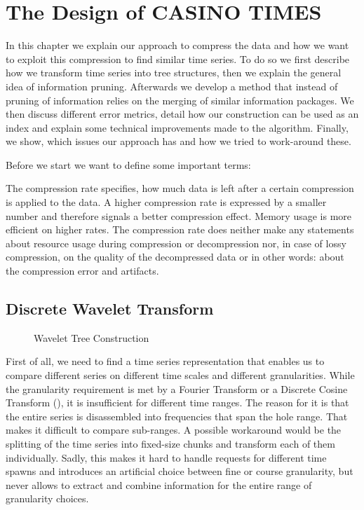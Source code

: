 \chapter{The Design of CASINO TIMES}
\label{ch:algorithm}

In this chapter we explain our approach to compress the data and how we want to exploit this compression to find similar time series. To do so we first describe how we transform time series into tree structures, then we explain the general idea of information pruning. Afterwards we develop a method that instead of pruning of information relies on the merging of similar information packages. We then discuss different error metrics, detail how our construction can be used as an index and explain some technical improvements made to the algorithm. Finally, we show, which issues our approach has and how we tried to work-around these.

Before we start we want to define some important terms:

\begin{definition}
    The compression rate specifies, how much data is left after a certain compression is applied to the data. A higher compression rate is expressed by a smaller number and therefore signals a better compression effect. Memory usage is more efficient on higher rates. The compression rate does neither make any statements about resource usage during compression or decompression nor, in case of lossy compression, on the quality of the decompressed data or in other words: about the compression error and artifacts.
\end{definition}



\section{Discrete Wavelet Transform}
\label{sec:algorithm:wavelet}

\begin{figure}
    \centering
    
    \caption{Wavelet Tree Construction}\label{fig:wavelet_tree_example}
\end{figure}

First of all, we need to find a time series representation that enables us to compare different series on different time scales and different granularities. While the granularity requirement is met by a Fourier Transform or a Discrete Cosine Transform (\cite{DCT1,DCT2}), it is insufficient for different time ranges. The reason for it is that the entire series is disassembled into frequencies that span the hole range. That makes it difficult to compare sub-ranges. A possible workaround would be the splitting of the time series into fixed-size chunks and transform each of them individually. Sadly, this makes it hard to handle requests for different time spawns and introduces an artificial choice between fine or course granularity, but never allows to extract and combine information for the entire range of granularity choices.

